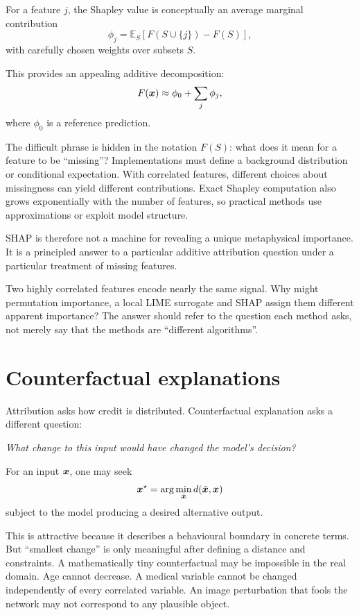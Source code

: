 For a feature \(j\), the Shapley value is conceptually an average marginal contribution
\[
  \phi_j
  = \mathbb{E}_{S}
  \left[
    F(S\cup\{j\})-F(S)
  \right],
\]
with carefully chosen weights over subsets \(S\).

This provides an appealing additive decomposition:
\[
  F(\bm{x})
  \approx \phi_0 + \sum_j \phi_j,
\]
where \(\phi_0\) is a reference prediction.

The difficult phrase is hidden in the notation \(F(S)\): what does it mean for a feature to be ``missing''? Implementations must define a background distribution or conditional expectation. With correlated features, different choices about missingness can yield different contributions. Exact Shapley computation also grows exponentially with the number of features, so practical methods use approximations or exploit model structure.

SHAP is therefore not a machine for revealing a unique metaphysical importance. It is a principled answer to a particular additive attribution question under a particular treatment of missing features.

\begin{checkpointbox}
Two highly correlated features encode nearly the same signal. Why might permutation importance, a local LIME surrogate and SHAP assign them different apparent importance? The answer should refer to the question each method asks, not merely say that the methods are ``different algorithms''.
\end{checkpointbox}

\section{Counterfactual explanations}

Attribution asks how credit is distributed. Counterfactual explanation asks a different question:

\begin{center}
\emph{What change to this input would have changed the model's decision?}
\end{center}

For an input \(\bm{x}\), one may seek
\[
  \bm{x}^{\star}
  = \arg\min_{\tilde{\bm{x}}}
      d(\tilde{\bm{x}},\bm{x})
\]
subject to the model producing a desired alternative output.

This is attractive because it describes a behavioural boundary in concrete terms. But ``smallest change'' is only meaningful after defining a distance and constraints. A mathematically tiny counterfactual may be impossible in the real domain. Age cannot decrease. A medical variable cannot be changed independently of every correlated variable. An image perturbation that fools the network may not correspond to any plausible object.

